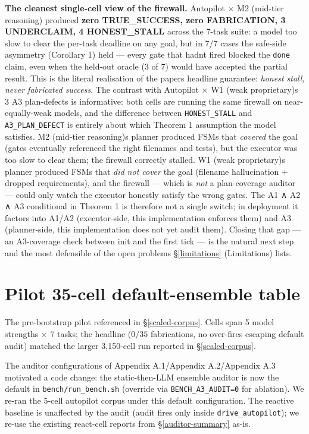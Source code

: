 \textbf{The cleanest single-cell view of the firewall.} Autopilot × M2 (mid-tier reasoning) produced
\textbf{zero TRUE\_SUCCESS, zero FABRICATION, 3 UNDERCLAIM, 4 HONEST\_STALL} across the 7-task suite:
a model too slow to clear the per-task deadline on any goal, but in 7/7 cases the safe-side
asymmetry (Corollary 1) held --- every gate that hadn\textquotesingle t fired blocked the \texttt{done} claim, even
when the held-out oracle (3 of 7) would have accepted the partial result. This is the literal
realisation of the paper\textquotesingle s headline guarantee: \emph{honest stall, never fabricated success}.
The contrast with Autopilot × W1 (weak proprietary)\textquotesingle s 3 A3 plan-defects is informative: both cells
are running the same firewall on near-equally-weak models, and the difference between
\texttt{HONEST\_STALL} and \texttt{A3\_PLAN\_DEFECT} is entirely about which Theorem 1 assumption the model
satisfies. M2 (mid-tier reasoning)\textquotesingle s planner produced FSMs that \emph{covered} the goal (gates eventually
referenced the right filenames and tests), but the executor was too slow to clear them; the
firewall correctly stalled. W1 (weak proprietary)\textquotesingle s planner produced FSMs that \emph{did not cover} the
goal (filename hallucination + dropped requirements), and the firewall --- which is \emph{not} a
plan-coverage auditor --- could only watch the executor honestly satisfy the wrong gates. The
A1 ∧ A2 ∧ A3 conditional in Theorem 1 is therefore not a single switch; in deployment it
factors into A1/A2 (executor-side, this implementation enforces them) and A3 (planner-side,
this implementation does not yet audit them). Closing that gap --- an A3-coverage check between
init and the first tick --- is the natural next step and the most defensible of the open
problems \S\ref{limitations} (Limitations) lists.


\section{Pilot 35-cell default-ensemble table}\label{app:pilot}

The pre-bootstrap pilot referenced in \S\ref{scaled-corpus}. Cells span 5 model
strengths $\times$ 7 tasks; the headline ($0/35$ fabrications, no over-fires escaping
default audit) matched the larger 3{,}150-cell run reported in \S\ref{scaled-corpus}.



The auditor configurations of Appendix A.1/Appendix A.2/Appendix A.3 motivated a code change: the static-then-LLM
ensemble auditor is now the default in \texttt{bench/run\_bench.sh} (override via
\texttt{BENCH\_A3\_AUDIT=0} for ablation). We re-ran the 5-cell autopilot corpus under this
default configuration. The reactive baseline is unaffected by the audit (audit fires only
inside \texttt{drive\_autopilot}); we re-use the existing react-cell reports from \S\ref{auditor-summary} as-is.

